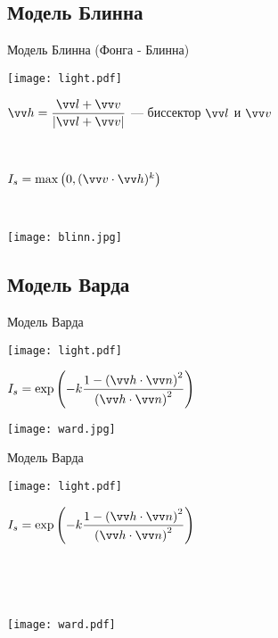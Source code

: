 \documentclass[10pt]{beamer}
\begin{document}
 	\subsection{Модель Блинна}
 
 \begin{frame}{Модель Блинна  (Фонга - Блинна)}
 	
 	{
 		\centering\texttt{[image: light.pdf]}	
 	}
 	{
 		$\vv h=\dfrac{\VV l + \vv v}{\abs{\VV l + \VV v}}$ --- биссектор $\vv l$ и $\vv v$
 		
 		
 		~
 		
 		$I_s=\max\big(0,(\VV v \cdot \VV h)^k \big)$
 		
 		~
 		
 		\texttt{[image: blinn.jpg]}
 	}
 	
 \end{frame}
 
 \subsection{Модель Варда}
 
 \begin{frame}{Модель Варда}
 	
 	{
 		\centering\texttt{[image: light.pdf]}
 		
 		
 	}
 	{
 		 		
 		$I_s=\exp\left(-k\dfrac{1-\left(\VV h\cdot \VV n\right)^2}{\left(\VV h\cdot \VV n\right)^2}\right)$
 		
 		
 		
 		\texttt{[image: ward.jpg]}
 	

 	}
 	
 \end{frame}
 
  
 \begin{frame}{Модель Варда}
 	
 	{
 		\centering\texttt{[image: light.pdf]}
 		
 		
 	}
 	{
 		
 		\hspace{1cm}$I_s=\exp\left(-k\dfrac{1-\left(\VV h\cdot \VV n\right)^2}{\left(\VV h\cdot \VV n\right)^2}\right)$
 		
 		
 		
 		~
 		
 		~
 		
 		\moveleft  1cm \hbox{\texttt{[image: ward.pdf]}}
 		
 		
 	}
 	
 \end{frame}
 
\end{document}
